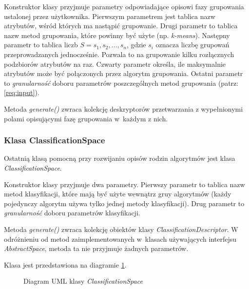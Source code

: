 \documentclass[../thesis.tex]{subfiles}
\begin{document}
Konstruktor klasy przyjmuje parametry odpowiadające opisowi fazy grupowania ustalonej przez użytkownika. Pierwszym parametrem jest tablica nazw atrybutów, wśród których ma nastąpić grupowanie. Drugi parametr to tablica nazw metod grupowania, które powinny być użyte (np. \emph{k-means}). Następny parametr to tablica liczb $S = s_1, s_2, \ldots, s_n$, gdzie $s_i$ oznacza liczbę grupowań przeprowadzanych jednocześnie. Pozwala to na grupowanie kilku rozłącznych podzbiorów atrybutów na raz. Czwarty parametr określa, ile maksymalnie atrybutów może być połączonych przez algorytm grupowania. Ostatni parametr to \emph{granularność} doboru parametrów poszczególnych metod grupowania (patrz: \ref{req:input}).

Metoda \emph{generate()} zwraca kolekcję deskryptorów przetwarzania z wypełnionymi polami opisującymi fazę grupowania w~każdym z nich.

\subsubsection{Klasa ClassificationSpace}

Ostatnią klasą pomocną przy rozwijaniu opisów rodzin algorytmów jest klasa \emph{ClassificationSpace}.

Konstruktor klasy przyjmuje dwa parametry. Pierwszy parametr to tablica nazw metod klasyfikacji, które mają być użyte wewnątrz gruy algorytmów (każdy pojedynczy algorytm używa tylko jednej metody klasyfikacji). Drug parametr to \emph{granularność} doboru parametrów klasyfikacji.

Metoda \emph{generate()} zwraca kolekcję obiektów klasy \emph{ClassificationDescriptor}. W odróżnieniu od metod zaimplementowanych w~klasach używających interfejsu \emph{AbstractSpace}, metoda ta nie przyjmuje żadnych parametrów.

Klasa jest przedstawiona na diagramie \ref{proj:diagram_classification_space}.

\begin{figure}[h]
\centering
{}
\caption{Diagram UML klasy \emph{ClassificationSpace}}
\label{proj:diagram_classification_space}
\end{figure}
\end{document}
